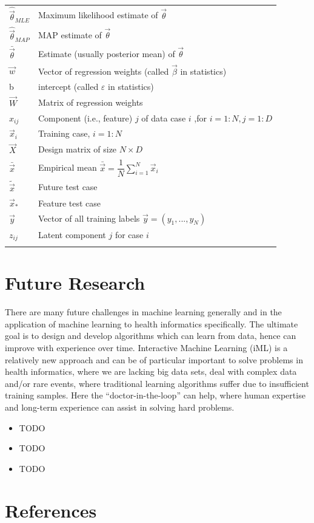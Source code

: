 \documentclass[a4paper,11pt]{article}
\begin{document}
\begin{longtable}{ll}
	$\hat{\vec{\theta}}_{MLE}$ & Maximum likelihood estimate of $\vec{\theta}$\\
	$\hat{\vec{\theta}}_{MAP}$ & MAP estimate of $\vec{\theta}$\\
	$\bar{\vec{\theta}}$ & Estimate (usually posterior mean) of  $\vec{\theta}$\\
	$\vec{w}$ & Vector of regression weights (called $\vec{\beta}$ in statistics)\\
	b & intercept (called $\varepsilon$ in statistics)\\
	$\vec{W}$ & Matrix of regression weights\\
	$x_{ij}$ & Component (i.e., feature) $j$ of data case $i$ ,for $i=1:N ,j=1:D$\\
	$\vec{x}_i$ & Training case, $i=1:N$\\
	$\vec{X}$ & Design matrix of size $N \times D$\\
	$\bar{\vec{x}}$ & Empirical mean $\bar{\vec{x}}=\dfrac{1}{N}\sum_{i=1}^{N} \vec{x}_i$\\
	$\tilde{\vec{x}}$ & Future test case\\
	$\vec{x}_*$ & Feature test case\\
	$\vec{y}$ & Vector of all training labels $\vec{y} =(y_1,...,y_N)$\\
	$z_{ij}$ & Latent component $j$ for case $i$\\
	\noalign{\smallskip}\hline\noalign{\smallskip}
\end{longtable}


\section{Future Research}

There are many future challenges in machine learning generally and in the application of machine learning to health informatics specifically. The ultimate goal is to design and develop algorithms which can learn from data, hence can improve with experience over time. Interactive Machine Learning (iML) is a relatively new approach and can be of particular important to solve problems in health informatics, where we are lacking big data sets, deal with complex data and/or rare events, where traditional learning algorithms suffer due to insufficient training samples. Here the “doctor-in-the-loop” can help, where human expertise and long-term experience can assist in solving hard problems.

\begin{itemize}
	\item TODO
	\item TODO
	\item TODO
\end{itemize}



\newpage

\section{References}

\begingroup
\renewcommand{\section}[2]{}


\end{document}
